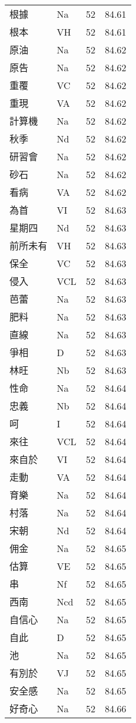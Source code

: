 \documentclass[twocolumn]{book}
\begin{document}
\begin{supertabular}{llrr}
根據 & Na & 52 &  84.61\\
根本 & VH & 52 &  84.61\\
原油 & Na & 52 &  84.62\\
原告 & Na & 52 &  84.62\\
重覆 & VC & 52 &  84.62\\
重現 & VA & 52 &  84.62\\
計算機 & Na & 52 &  84.62\\
秋季 & Nd & 52 &  84.62\\
研習會 & Na & 52 &  84.62\\
砂石 & Na & 52 &  84.62\\
看病 & VA & 52 &  84.62\\
為首 & VI & 52 &  84.63\\
星期四 & Nd & 52 &  84.63\\
前所未有 & VH & 52 &  84.63\\
保全 & VC & 52 &  84.63\\
侵入 & VCL & 52 &  84.63\\
芭蕾 & Na & 52 &  84.63\\
肥料 & Na & 52 &  84.63\\
直線 & Na & 52 &  84.63\\
爭相 & D & 52 &  84.63\\
林旺 & Nb & 52 &  84.63\\
性命 & Na & 52 &  84.64\\
忠義 & Nb & 52 &  84.64\\
呵 & I & 52 &  84.64\\
來往 & VCL & 52 &  84.64\\
來自於 & VI & 52 &  84.64\\
走動 & VA & 52 &  84.64\\
育樂 & Na & 52 &  84.64\\
村落 & Na & 52 &  84.64\\
宋朝 & Nd & 52 &  84.64\\
佣金 & Na & 52 &  84.65\\
估算 & VE & 52 &  84.65\\
串 & Nf & 52 &  84.65\\
西南 & Ncd & 52 &  84.65\\
自信心 & Na & 52 &  84.65\\
自此 & D & 52 &  84.65\\
池 & Na & 52 &  84.65\\
有別於 & VJ & 52 &  84.65\\
安全感 & Na & 52 &  84.65\\
好奇心 & Na & 52 &  84.66\\

\end{supertabular}
\end{document}
